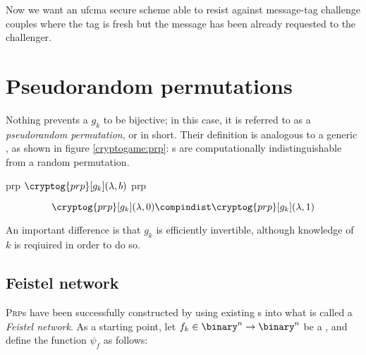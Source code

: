 Now we want an ufcma secure scheme able to resist against message-tag challenge couples where the tag is fresh but the message has been already requested to the challenger.

\section{Pseudorandom permutations}


Nothing prevents a \prf{} $g_k$ to be bijective; in this case, it is referred to as a \emph{pseudorandom permutation}, or \prp{} in short. Their definition is analogous to a generic \prf, as shown in figure \ref{cryptogame:prp}: \prp{}s are computationally indistinguishable from a random permutation.

\begin{cryptogame}
    {prp}
    {$\cryptog{prp}[g_k](\lambda, b)$}
    {prp}


    \cseqdelay
    \cseqbeginloop
    \cseqendloop
    \cseqdelay

    
\end{cryptogame}

\[
    \cryptog{prp}[g_k](\lambda, 0) \compindist \cryptog{prp}[g_k](\lambda, 1)
\]

An important difference is that $g_k$ is efficiently invertible, although knowledge of $k$ is reqiuired in order to do so.

\subsection{Feistel network}

\textsc{Prp}s have been successfully constructed by using existing \prf{}s into what is called a \emph{Feistel network}. As a starting point, let $f_k \in \binary^n \to \binary^n$ be a \prf, and define the function $\psi_f$ as follows:

